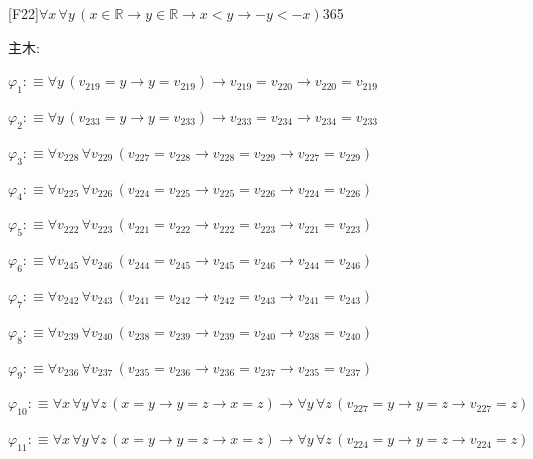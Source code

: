 \begin{fullproof}{[F22]}{$\forall x\,\forall y\,(x \in \mathbb{R} \to y \in \mathbb{R} \to x < y \to -y < -x)$}{365}
\begin{ptree}
\end{ptree}
\noindent 主木:
\begin{ptree}
\noLine
{}
\noLine
{}
\noLine
{}
\noLine
{}
\end{ptree}
\begin{abbrevlist}
\item $\varphi_{1} :\equiv \forall y\,(v_{219} = y \to y = v_{219}) \to v_{219} = v_{220} \to v_{220} = v_{219}$
\item $\varphi_{2} :\equiv \forall y\,(v_{233} = y \to y = v_{233}) \to v_{233} = v_{234} \to v_{234} = v_{233}$
\item $\varphi_{3} :\equiv \forall v_{228}\,\forall v_{229}\,(v_{227} = v_{228} \to v_{228} = v_{229} \to v_{227} = v_{229})$
\item $\varphi_{4} :\equiv \forall v_{225}\,\forall v_{226}\,(v_{224} = v_{225} \to v_{225} = v_{226} \to v_{224} = v_{226})$
\item $\varphi_{5} :\equiv \forall v_{222}\,\forall v_{223}\,(v_{221} = v_{222} \to v_{222} = v_{223} \to v_{221} = v_{223})$
\item $\varphi_{6} :\equiv \forall v_{245}\,\forall v_{246}\,(v_{244} = v_{245} \to v_{245} = v_{246} \to v_{244} = v_{246})$
\item $\varphi_{7} :\equiv \forall v_{242}\,\forall v_{243}\,(v_{241} = v_{242} \to v_{242} = v_{243} \to v_{241} = v_{243})$
\item $\varphi_{8} :\equiv \forall v_{239}\,\forall v_{240}\,(v_{238} = v_{239} \to v_{239} = v_{240} \to v_{238} = v_{240})$
\item $\varphi_{9} :\equiv \forall v_{236}\,\forall v_{237}\,(v_{235} = v_{236} \to v_{236} = v_{237} \to v_{235} = v_{237})$
\item $\varphi_{10} :\equiv \forall x\,\forall y\,\forall z\,(x = y \to y = z \to x = z) \to \forall y\,\forall z\,(v_{227} = y \to y = z \to v_{227} = z)$
\item $\varphi_{11} :\equiv \forall x\,\forall y\,\forall z\,(x = y \to y = z \to x = z) \to \forall y\,\forall z\,(v_{224} = y \to y = z \to v_{224} = z)$

\end{abbrevlist}
\end{fullproof}

